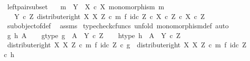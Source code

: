 \begin{isabellebody}
\ left{\isacharunderscore}{\kern0pt}pair{\isacharunderscore}{\kern0pt}subset{\isacharcolon}{\kern0pt}\isanewline
\ \ \ {\isachardoublequoteopen}m\ {\isacharcolon}{\kern0pt}\ Y\ {\isasymrightarrow}\ X\ {\isasymtimes}\isactrlsub c\ X{\isachardoublequoteclose}\ {\isachardoublequoteopen}monomorphism\ m{\isachardoublequoteclose}\isanewline
\ \ \ {\isachardoublequoteopen}{\isacharparenleft}{\kern0pt}Y\ {\isasymtimes}\isactrlsub c\ Z{\isacharcomma}{\kern0pt}\ distribute{\isacharunderscore}{\kern0pt}right\ X\ X\ Z\ {\isasymcirc}\isactrlsub c\ {\isacharparenleft}{\kern0pt}m\ {\isasymtimes}\isactrlsub f\ id\isactrlsub c\ Z{\isacharparenright}{\kern0pt}{\isacharparenright}{\kern0pt}\ {\isasymsubseteq}\isactrlsub c\ {\isacharparenleft}{\kern0pt}X\ {\isasymtimes}\isactrlsub c\ Z{\isacharparenright}{\kern0pt}\ {\isasymtimes}\isactrlsub c\ {\isacharparenleft}{\kern0pt}X\ {\isasymtimes}\isactrlsub c\ Z{\isacharparenright}{\kern0pt}{\isachardoublequoteclose}\isanewline
%
\isadelimproof
\ \ %
\endisadelimproof
%
\isatagproof
{}\isamarkupfalse%
\ subobject{\isacharunderscore}{\kern0pt}of{\isacharunderscore}{\kern0pt}def{}\ \isamarkupfalse%
\ assms\isanewline
{}\isamarkupfalse%
\ {\isacharparenleft}{\kern0pt}typecheck{\isacharunderscore}{\kern0pt}cfuncs{\isacharcomma}{\kern0pt}\ unfold\ monomorphism{\isacharunderscore}{\kern0pt}def{}{\isacharcomma}{\kern0pt}\ auto{\isacharparenright}{\kern0pt}\isanewline
\ \ \isamarkupfalse%
\ g\ h\ A\isanewline
\ \ \isamarkupfalse%
\ g{\isacharunderscore}{\kern0pt}type{\isacharcolon}{\kern0pt}\ {\isachardoublequoteopen}g\ {\isacharcolon}{\kern0pt}\ A\ {\isasymrightarrow}\ Y\ {\isasymtimes}\isactrlsub c\ Z{\isachardoublequoteclose}\isanewline
\ \ \isamarkupfalse%
\ h{\isacharunderscore}{\kern0pt}type{\isacharcolon}{\kern0pt}\ {\isachardoublequoteopen}h\ {\isacharcolon}{\kern0pt}\ A\ {\isasymrightarrow}\ Y\ {\isasymtimes}\isactrlsub c\ Z{\isachardoublequoteclose}\isanewline
\ \ \isamarkupfalse%
\ {\isachardoublequoteopen}{\isacharparenleft}{\kern0pt}distribute{\isacharunderscore}{\kern0pt}right\ X\ X\ Z\ {\isasymcirc}\isactrlsub c\ {\isacharparenleft}{\kern0pt}m\ {\isasymtimes}\isactrlsub f\ id\isactrlsub c\ Z{\isacharparenright}{\kern0pt}{\isacharparenright}{\kern0pt}\ {\isasymcirc}\isactrlsub c\ g\ {\isacharequal}{\kern0pt}\ {\isacharparenleft}{\kern0pt}distribute{\isacharunderscore}{\kern0pt}right\ X\ X\ Z\ {\isasymcirc}\isactrlsub c\ m\ {\isasymtimes}\isactrlsub f\ id\isactrlsub c\ Z{\isacharparenright}{\kern0pt}\ {\isasymcirc}\isactrlsub c\ h{\isachardoublequoteclose}\isanewline

\end{isabellebody}

